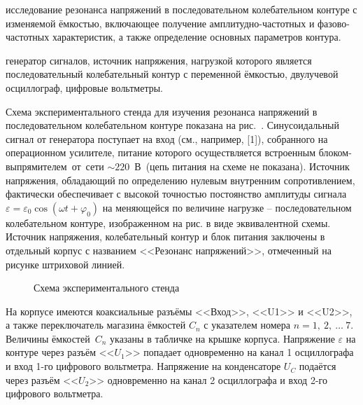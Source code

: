 
\begin{lab:aim}
     исследование резонанса напряжений в последовательном колебательном контуре с изменяемой ёмкостью, включающее получение амплитудно-частотных и фазово-частотных характеристик, а также определение основных параметров контура.
\end{lab:aim}

\begin{lab:equipment}
	генератор сигналов, источник напряжения, нагрузкой которого является последовательный колебательный контур с переменной ёмкостью, двулучевой осциллограф, цифровые вольтметры.
\end{lab:equipment}


\experiment
Схема экспериментального стенда для изучения резонанса напряжений в последовательном колебательном контуре показана на рис.~. Синусоидальный сигнал от генератора поступает на вход  (см., например, [1]), собранного на операционном усилителе, питание которого осуществляется встроенным блоком-выпрямителем~от~сети  $\sim220$~В~(цепь питания на схеме не показана). Источник напряжения, обладающий по определению нулевым внутренним сопротивлением, фактически обеспечивает с высокой точностью постоянство амплитуды сигнала~$\varepsilon=\varepsilon_0\cos(\omega t+\varphi_0)$ на меняющейся по величине нагрузке – последовательном колебательном контуре, изображенном на рис.  в виде эквивалентной схемы. Источник напряжения, колебательный контур и блок питания заключены в отдельный корпус с названием <<Резонанс напряжений>>, отмеченный на рисунке штриховой линией.
\begin{figure}[h!]
	\caption{Схема экспериментального стенда}
\end{figure}

На корпусе имеются коаксиальные разъёмы <<Вход>>, <<U1>> и <<U2>>, а также переключатель магазина ёмкостей $C_n$ с указателем номера $n=1,~2,~\ldots~7.$ Величины ёмкостей~$C_n$ указаны в табличке на крышке корпуса. Напряжение $\varepsilon$ на контуре через разъём <<$U_1$>> попадает одновременно на канал 1 осциллографа и вход 1-го цифрового вольтметра. Напряжение на конденсаторе $U_C$ подаётся через разъём <<$U_2$>> одновременно на канал 2 осциллографа и вход 2-го цифрового вольтметра.

